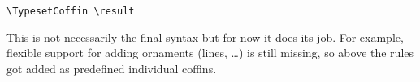 \documentclass{article}
\begin{document}
\begin{center}
\begin{minipage}{14cm}
\begin{verbatim}
\TypesetCoffin \result
\end{verbatim}

This is not necessarily the final syntax but for now it does its job. For
example, flexible support for adding ornaments (lines, \ldots) is still
missing, so above the rules got added as predefined individual coffins.

\end{minipage}
\end{center}
\end{document}
